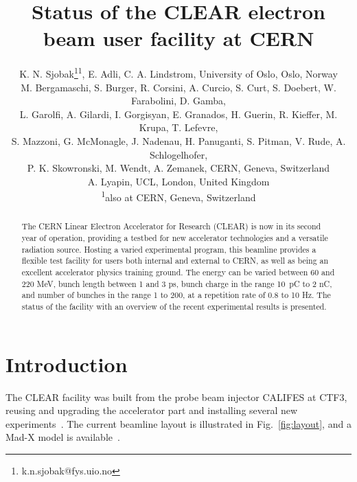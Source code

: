 \documentclass[a4paper,
               keeplastbox,   %
               ]{jacow}
\begin{document}
\title{Status of the CLEAR electron beam user facility at CERN}

\author{K. N. Sjobak\thanks{k.n.sjobak@fys.uio.no}\textsuperscript{1}, E. Adli, C. A. Lindstrom, University of Oslo, Oslo, Norway\\
  M. Bergamaschi, S. Burger, R. Corsini, A. Curcio, S. Curt, S. Doebert, W. Farabolini, D. Gamba,\\
  L. Garolfi, A. Gilardi, I. Gorgisyan, E. Granados, H. Guerin, R. Kieffer, M. Krupa, T. Lefevre,\\
  S. Mazzoni, G. McMonagle, J. Nadenau, H. Panuganti, S. Pitman, V. Rude, A. Schlogelhofer,\\
  P. K. Skowronski, M. Wendt, A. Zemanek, CERN, Geneva, Switzerland \\
  A. Lyapin, UCL, London, United Kingdom \\
  \textsuperscript{1}also at CERN, Geneva, Switzerland}

\maketitle

%
\begin{abstract}
  The CERN Linear Electron Accelerator for Research (CLEAR) is now in its second year of operation, providing a testbed for new accelerator technologies and a versatile radiation source.
  Hosting a varied experimental program, this beamline provides a flexible test facility for users both internal and external to CERN, as well as being an excellent accelerator physics training ground.
  The energy can be varied between 60 and 220 MeV, bunch length between 1 and 3 ps, bunch charge in the range 10~pC to 2 nC, and number of bunches in the range 1 to 200, at a repetition rate of 0.8 to 10 Hz.
  The status of the facility with an overview of the recent experimental results is presented.
\end{abstract}

\section{Introduction}

The CLEAR facility was built from the probe beam injector CALIFES at CTF3, reusing and upgrading the accelerator part and installing several new experiments~\cite{Gamba::CLEAR,Corsini:FirstCLEAR,CLEAR-WEB}.
The current beamline layout is illustrated in Fig.~\ref{fig:layout}, and a Mad-X model is available~\cite{CLEAR-MADX}.
\end{document}
